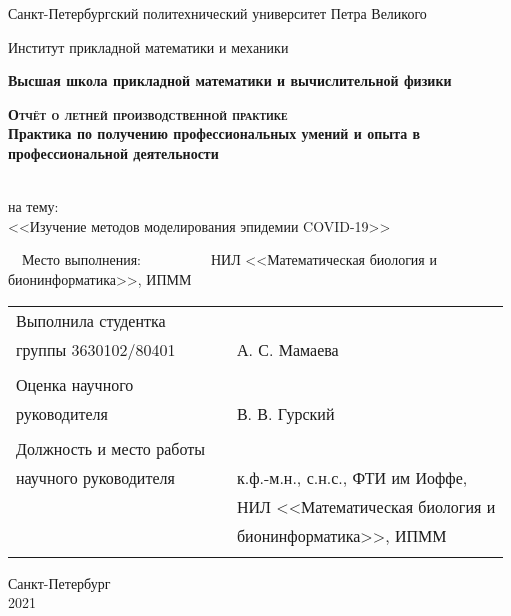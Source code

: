 \documentclass{article}
\begin{document}
\begin{titlepage}
  \begin{center}
  
     
    \large
    
    Санкт-Петербургский политехнический университет Петра Великого
    
    Институт прикладной математики и механики
    
    \textbf{Высшая школа прикладной математики и вычислительной физики}
    
    \vfill
     
     
    \textsc{\textbf{\Large{Отчёт о летней производственной практике}}}\\[5mm]
     
    {\large \textbf{Практика по получению профессиональных умений и опыта в профессиональной деятельности}}
    
    \\ на тему:\\ <<Изучение методов моделирования эпидемии COVID-19>>\\

\end{center}

\vfill

~~Место выполнения:~~~~~~~~~~НИЛ <<Математическая биология и бионинформатика>>, ИПММ \\

\begin{tabular}{l p{} l}
Выполнила студентка \\группы 3630102/80401 &  &\underline{\hspace{3cm}}   А. С. Мамаева\\\\

Оценка научного \\ руководителя &  & \underline{\hspace{1.5cm}} \underline{\hspace{2cm}}   В. В. Гурский \\\\

Должность и место работы\\ научного руководителя & & к.ф.-м.н., с.н.с., ФТИ им Иоффе,\\  
&& НИЛ <<Математическая биология и\\ &&бионинформатика>>, ИПММ \\\\
\end{tabular}

\hfill \break
\hfill \break
\begin{center} Санкт-Петербург \\2021 \end{center}
\thispagestyle{empty}
 
\end{titlepage}
\newpage
\begin{center}
    \setcounter{page}{2}
    \tableofcontents  
\end{center}
\end{document}
